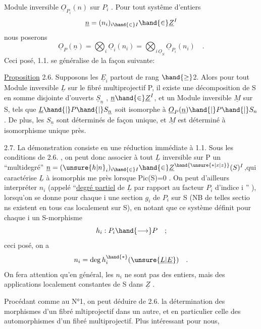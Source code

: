 
Module inversible $\underline{O}_{P_i}(n)$ sur $P_i$ . Pour tout systême d'entiers
\[ \underline{n} = (n_i)_{i \hand{\in} I} \hand{\in} \underline{Z}^I \]
nous  poserons
\[ \underline{O}_P(\underline{n}) = \bigotimes_i \underline{O}_i(n_i) = \bigotimes_{i\,\underline{O}_S} \underline{O}_{P_i}(n_i) \quad . \]
Ceci posé, 1.1. se généralise de la façon suivante:

\uline{Proposition} 2.6. Supposons les $\underline{E}_i$ partout de rang $\hand{\geq}$2. Alors pour tout
Module inversible $\underline{L}$ sur le fibré multiprojectif P, il existe une
 décomposition de S en somme disjointe d'ouverts $\underline{S}_{\underline{n}}$ , $\underline{n} \hand{\in} \underline{Z}^I$,
et  un Module inversible $\underline{M}$ sur S, tels que $\underline{L}\hand{|}P\hand{|}S_{\underline{n}}$
soit isomorphe à $\underline{O}_P(\underline{n})\hand{|}P\hand{|}S_n$ . De plus, les $S_{\underline{n}}$ sont déterminés de façon
unique, et  $\underline{M}$ est déterminé à isomorphisme unique près.

2.7. La démonstration  consiste en une réduction immédiate à 1.1.
Sous les conditions de 2.6. , on peut donc associer à tout $\underline{L}$ inversible
sur P un ``multidegré'' $\underline{n} = (\unsure{h|n}_i)_{i \hand{\in} I} \hand{\in} \underline{Z}^{\hand{\unsure{*|x|z}}}(S)^I$,qui caractérise $\underline{L}$ à isomorphis
me près lorsque Pic(S)=0 . On peut d'ailleurs interpréter $n_i$ (appelé
``\uline{degré partiel} de $\underline{L}$ par rapport au facteur $P_i$ d'indice i '' ), lorsqu'on
se donne pour chaque i une section $g_i$ de $P_i$ sur S (NB de telles sectio
ns existent en tous cas localement sur S), en notant que ce système définit
pour chaque i un S-morphisme 
\[ h_i : P_i \hand{\longrightarrow} P \quad ; \]
ceci posé, on a
\[ n_i = \deg h_i^{\hand{*}}(\unsure{\underline{L}|\underline{E}}) \quad . \]
On fera attention qu'en général, les $n_i$ ne sont pas des entiers, mais des
applications localement constantes de S dans $\underline{Z}$ .

Procédant comme au N°1, on peut déduire de 2.6. la détermination des
morphismes d'un fibré mltiprojectif dans un autre, et en particulier celle
des automorphismes d'un fibré multiprojectif. Plus intéressant pour nous,

